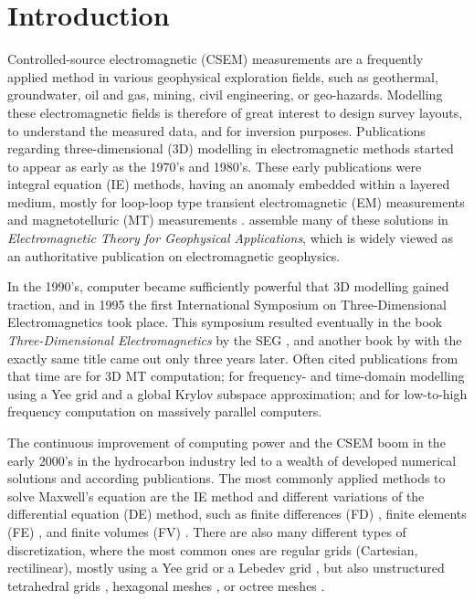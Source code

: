 \documentclass[
    paper,
  ]{geophysics}
\begin{document}
\section{Introduction}

Controlled-source electromagnetic (CSEM) measurements are a frequently applied method in various geophysical exploration fields, such as geothermal, groundwater, oil and gas, mining, civil engineering, or geo-hazards. Modelling these electromagnetic fields is therefore of great interest to design survey layouts, to understand the measured data, and for inversion purposes. Publications regarding three-dimensional (3D) modelling in electromagnetic methods started to appear as early as the 1970's and 1980's. These early publications were integral equation (IE) methods, having an anomaly embedded within a layered medium, mostly for loop-loop type transient electromagnetic (EM) measurements  \citep{GJI.74.Raiche, GEO.75.Hohmann, GJI.82.Das, GEO.86.Newman} and magnetotelluric (MT) measurements \citep{GEO.84.Wannamaker}. \cite{B.SEG.88.Ward} assemble many of these solutions in \emph{Electromagnetic Theory for Geophysical Applications}, which is widely viewed as an authoritative publication on electromagnetic geophysics.

In the 1990's, computer became sufficiently powerful that 3D modelling gained traction, and in 1995 the first International Symposium on Three-Dimensional Electromagnetics took place. This symposium resulted eventually in the book \emph{Three-Dimensional Electromagnetics} by the SEG \citep{B.SEG.99.Oristaglio}, and another book by \cite{B.02.Wannamaker} with the exactly same title came out only three years later. Often cited publications from that time are \cite{RSC.94.Mackie} for 3D MT computation; \cite{RS.94.Druskin} for frequency- and time-domain modelling using a Yee grid and a global Krylov subspace approximation; and \cite{RS.96.Alumbaugh, GJI.97.Newman} for low-to-high frequency computation on massively parallel computers.

The continuous improvement of computing power and the CSEM boom in the early 2000's in the hydrocarbon industry led to a wealth of developed numerical solutions and according publications. The most commonly applied methods to solve Maxwell's equation are the IE method \citep{GJI.74.Raiche, RS.02.Hursan, GEO.06.Zhdanov, GP.10.Tehrani, CAG.16.Kruglyakov, MGS.17.Kruglyakov} and different variations of the differential equation (DE) method, such as finite differences (FD) \citep{GEO.93.Wang, RS.94.Druskin, RSC.94.Mackie, GEO.09.Streich, CAG.13.Sommer}, finite elements (FE) \citep{GEO.04.Commer, GJI.11.Schwarzbach,GEO.12.daSilva, GJI.13.Grayver, GJI.13.Puzyrev, SEG.16.Zhang}, and finite volumes (FV) \citep{EM.90.Madsen, SIAM.01.Haber, PIER.01.Clemens, GEO.14.Jahandari}. There are also many different types of discretization, where the most common ones are regular grids (Cartesian, rectilinear), mostly using a Yee grid \citep{IEEE.66.Yee} or a Lebedev grid \citep{CMMP.64.Lebedev}, but also unstructured tetrahedral grids \citep{SEG.16.Zhang, CAG.17.Cai}, hexagonal meshes \citep{CAG.14.Cai}, or octree meshes \citep{ECP.07.Haber}.
\end{document}
